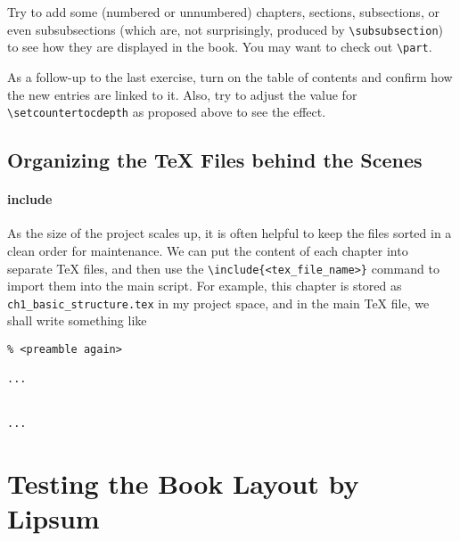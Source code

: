 \begin{exercisebox}
\begin{Exercise}
Try to add some (numbered or unnumbered) chapters, sections, subsections, or even subsubsections (which are, not surprisingly, produced by \texttt{\textbackslash subsubsection}) to see how they are displayed in the book. You may want to check out \texttt{\textbackslash part}.
\end{Exercise}
\begin{Exercise}
As a follow-up to the last exercise, turn on the table of contents and confirm how the new entries are linked to it. Also, try to adjust the value for \texttt{\textbackslash setcounter{tocdepth}} as proposed above to see the effect.
\end{Exercise}
\end{exercisebox}

\subsection{Organizing the \TeX{} Files behind the Scenes}
\label{subsection:TeXorg}

\paragraph{include}
As the size of the project scales up, it is often helpful to keep the files sorted in a clean order for maintenance. We can put the content of each chapter into separate \TeX{} files, and then use the \texttt{\textbackslash include\{<tex\_file\_name>\}} command to import them into the main script. For example, this chapter is stored as \texttt{ch1\_basic\_structure.tex} in my project space, and in the main \TeX{} file, we shall write something like
\begin{lstlisting}
% <preamble again>

...


...

\end{lstlisting}

\section{Testing the Book Layout by Lipsum}

